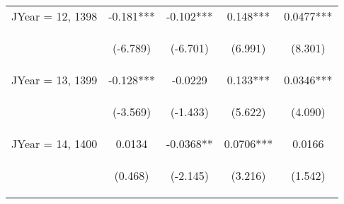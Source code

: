 \documentclass[]{article}
\begin{document}
\begin{center}
\begin{tabular}{lcccc}
        JYear = 12, 1398 & -0.181***                                       & -0.102***                                      & 0.148***                                       & 0.0477***                                      \\
        \vspace{4pt}     & \begin{footnotesize}(-6.789)\end{footnotesize}  & \begin{footnotesize}(-6.701)\end{footnotesize} & \begin{footnotesize}(6.991)\end{footnotesize}  & \begin{footnotesize}(8.301)\end{footnotesize}  \\
        JYear = 13, 1399 & -0.128***                                       & -0.0229                                        & 0.133***                                       & 0.0346***                                      \\
        \vspace{4pt}     & \begin{footnotesize}(-3.569)\end{footnotesize}  & \begin{footnotesize}(-1.433)\end{footnotesize} & \begin{footnotesize}(5.622)\end{footnotesize}  & \begin{footnotesize}(4.090)\end{footnotesize}  \\
        JYear = 14, 1400 & 0.0134                                          & -0.0368**                                      & 0.0706***                                      & 0.0166                                         \\
        \vspace{4pt}     & \begin{footnotesize}(0.468)\end{footnotesize}   & \begin{footnotesize}(-2.145)\end{footnotesize} & \begin{footnotesize}(3.216)\end{footnotesize}  & \begin{footnotesize}(1.542)\end{footnotesize}  \\

\end{tabular}
\end{center}
\end{document}
